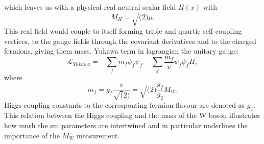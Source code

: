   which leaves us with a physical real neutral scalar field $H(x)$ with 
    \begin{equation}
	M_H=\sqrt(2)\mu.
  \end{equation}
 This real field would couple to itself forming triple and quartic self-coupling vertices, to the gauge fields through the covariant derivatives and to the charged fermions, giving them mass. Yukawa term in lagrangian the unitary gauge:
     \begin{equation}
\mathcal{L}_{Yukawa}=-\sum_f m_f \bar\psi_f\psi_f-\sum_f \frac{m_f}{v} \bar\psi_f\psi_f H,
 \end{equation}
where
\begin{equation}
m_f=g_f\frac{v}{\sqrt(2)}=\sqrt(2)\frac{g_f}{g_2}M_W.
\end{equation}
Higgs coupling constants to the corresponting fermion flavour are denoted as $g_f$. This relation between the Higgs coupling and the mass of the W boson illustrates how mush the \gls{sm} parameters are intertwined and in particular underlines the importance of the $M_W$ measurement.
